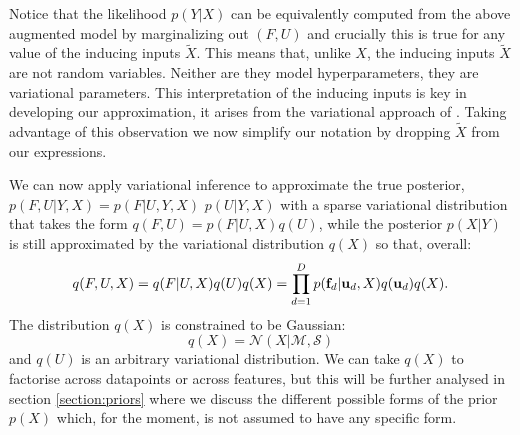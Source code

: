 Notice that the likelihood $p(Y|X)$
can be equivalently computed from the above augmented
model by marginalizing out $(F, U)$ and crucially this is
true for any value of the inducing inputs $\tilde{X}$. This means
that, unlike $X$, the inducing inputs $\tilde{X}$ are not random variables.
Neither are they model hyperparameters, they are
variational parameters. This interpretation of the inducing
inputs is key in developing our approximation, it arises
from the variational approach of \cite{Titsias09}. Taking
advantage of this observation we now simplify our notation
by dropping $\tilde{X}$ from our expressions.

We can now
apply variational inference to approximate the true posterior,
$p(F, U | Y, X) = p(F | U, Y, X)$ $p(U | Y, X)$ with
a sparse variational distribution that takes the form
$q(F, U) = p(F | U, X)q(U)$, while the posterior $p(X|Y)$ is still approximated
by the variational distribution $q(X)$ so that, overall:
%
\begin{equation}
\label{varDistr}
q(F, U,X) = q(F | U, X) q(U) q(X) = \prod_{d=1}^D p(\mathbf{f}_d | \mathbf{u}_d, X )q(\mathbf{u}_d) q(X) .
\end{equation}
%
The distribution $q(X)$ is constrained to be Gaussian:
\begin{equation}
  \label{qX}
  q(X) =  \mathcal{N} \left( X | \mathcal{M}, \mathcal{S} \right)
\end{equation}
and $q(U)$ is an arbitrary variational distribution.
We can take $q(X)$ to factorise across datapoints or across
features, but this will be further analysed in section
\ref{section:priors} where we discuss the different possible forms of the prior $p(X)$
which, for the moment, is not assumed to have any specific form.

